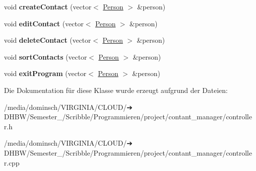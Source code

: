 \begin{DoxyCompactItemize}
void {\bfseries create\+Contact} (vector$<$ \hyperlink{classContactManager_1_1Person}{Person} $>$ \&person)
\item 
\mbox{\label{classContactManager_1_1Controller_a53c3a1c796234dfd8ba4778c2a0621f2}} 
void {\bfseries edit\+Contact} (vector$<$ \hyperlink{classContactManager_1_1Person}{Person} $>$ \&person)
\item 
\mbox{\label{classContactManager_1_1Controller_a87af8bc174a36e01cedb9a892a6b6aa0}} 
void {\bfseries delete\+Contact} (vector$<$ \hyperlink{classContactManager_1_1Person}{Person} $>$ \&person)
\item 
\mbox{\label{classContactManager_1_1Controller_af3f6d4b019d84eda7cd83447158cb61c}} 
void {\bfseries sort\+Contacts} (vector$<$ \hyperlink{classContactManager_1_1Person}{Person} $>$ \&person)
\item 
\mbox{\label{classContactManager_1_1Controller_a5c039c4de9d2bb309b6c212c162b115c}} 
void {\bfseries exit\+Program} (vector$<$ \hyperlink{classContactManager_1_1Person}{Person} $>$ \&person)
\end{DoxyCompactItemize}


Die Dokumentation für diese Klasse wurde erzeugt aufgrund der Dateien\+:\begin{DoxyCompactItemize}
\item 
/media/dominsch/\+V\+I\+R\+G\+I\+N\+I\+A/\+C\+L\+O\+U\+D/➔ D\+H\+B\+W/\+Semester\+\_/\+Scribble/\+Programmieren/project/contant\+\_\+manager/controller.\+h\item 
/media/dominsch/\+V\+I\+R\+G\+I\+N\+I\+A/\+C\+L\+O\+U\+D/➔ D\+H\+B\+W/\+Semester\+\_/\+Scribble/\+Programmieren/project/contant\+\_\+manager/controller.\+cpp\end{DoxyCompactItemize}
